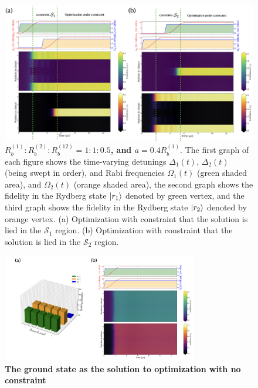 \documentclass[%
 reprint,
nofootinbib,
 amsmath,amssymb,
 aps,
floatfix,
]{revtex4-2}
\begin{document}
\begin{figure}[ht!]
    \centering
    \includegraphics[width=14cm]{picture/case1_QOconstraint3.png}
    \caption{\textbf{$R^{(1)}_b:R^{(2)}_b:R^{(12)}_b=1:1:0.5$, and $a = 0.4R^{(1)}_b$}. The first graph of each figure shows the time-varying detunings $\Delta_1(t)$, $\Delta_2(t)$ (being swept in order), and Rabi frequencies $\Omega_1(t)$ (green shaded area), and $\Omega_2(t)$ (orange shaded area), the second graph shows the fidelity in the Rydberg state $\ket{r_1}$ denoted by green vertex, and the third graph shows the fidelity in the Rydberg state $\ket{r_2}$ denoted by orange vertex. (a) Optimization with constraint that the solution is lied in the $\mathcal{S}_1$ region. (b) Optimization with constraint that the solution is lied in the $\mathcal{S}_2$ region.}
    \label{fig:case1_sequential_driving_2}
\end{figure}
\begin{figure}[ht!]
    \centering
    \includegraphics[width=8.5cm]{picture/case1_QOconstraint1.png}
    \caption{\textbf{The ground state as the solution to optimization with no constraint}}
    \label{fig:case1_same_driving}
\end{figure}
\end{document}
